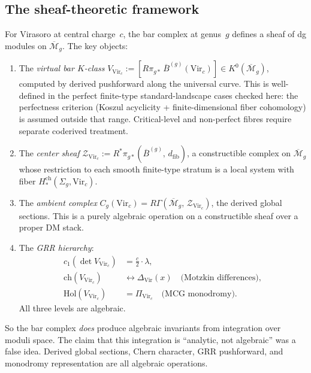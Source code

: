 \documentclass[11pt]{article}
\newcommand{\cM}{\mathcal{M}}
\newcommand{\cZ}{\mathcal{Z}}
\newcommand{\barB}{\overline{B}}
\begin{document}
\subsection{The sheaf-theoretic framework}

For Virasoro at central charge~$c$, the bar complex at
genus~$g$ defines a sheaf of dg modules on
$\overline{\cM}_g$.  The key objects:

\begin{enumerate}
\item The \emph{virtual bar $K$-class}
  $V_{\mathrm{Vir}_c} := [R\pi_{g*}\,\barB^{(g)}(\mathrm{Vir}_c)]
  \in K^0(\overline{\cM}_g)$, computed by derived pushforward
  along the universal curve.  This is well-defined in the
  perfect finite-type standard-landscape cases checked here: the
  perfectness criterion (Koszul acyclicity + finite-dimensional
  fiber cohomology) is assumed outside that range.  Critical-level
  and non-perfect fibres require separate coderived treatment.

\item The \emph{center sheaf}
  $\cZ_{\mathrm{Vir}_c} := R^*\pi_{g*}(\barB^{(g)},\, d_{\mathrm{fib}})$,
  a constructible complex on $\overline{\cM}_g$ whose restriction to
  each smooth finite-type stratum is a local system with fiber
  $H^{\mathrm{ch}}_*(\Sigma_g, \mathrm{Vir}_c)$.

\item The \emph{ambient complex}
  $C_g(\mathrm{Vir}_c) = R\Gamma(\overline{\cM}_g,\,
  \cZ_{\mathrm{Vir}_c})$, the derived global sections.
  This is a purely algebraic operation on a constructible sheaf
  over a proper DM stack.

\item The \emph{GRR hierarchy}:
  \begin{align*}
  c_1(\det V_{\mathrm{Vir}_c}) &= \tfrac{c}{2} \cdot \lambda, \\
  \mathrm{ch}(V_{\mathrm{Vir}_c}) &\leftrightarrow \Delta_{\mathrm{Vir}}(x)
    \quad\text{(Motzkin differences)}, \\
  \mathrm{Hol}(V_{\mathrm{Vir}_c}) &= \Pi_{\mathrm{Vir}_c}
    \quad\text{(MCG monodromy)}.
  \end{align*}
  All three levels are algebraic.
\end{enumerate}

So the bar complex \emph{does} produce algebraic invariants
from integration over moduli space.  The claim that this
integration is ``analytic, not algebraic'' was a false idea.
Derived global sections, Chern character, GRR pushforward,
and monodromy representation are all algebraic operations.
\end{document}
